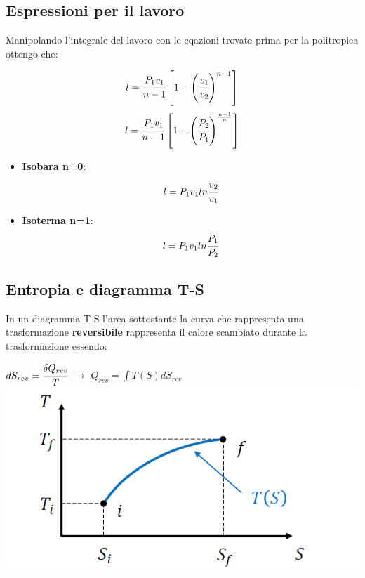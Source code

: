 \documentclass[a4paper,12pt,titlepage]{article}
\begin{document}
\subsection{Espressioni per il lavoro}
Manipolando l'integrale del lavoro con le eqazioni trovate prima per la politropica ottengo che:
\begin{center}
$$ l = \cfrac{P_{1}v_{1}}{n-1}\left[ 1- \left( \cfrac{v_{1}}{v_{2}} \right)^{n-1} \right]
$$
$$
l = \cfrac{P_{1}v_{1}}{n-1}\left[ 1- \left( \cfrac{P_{2}}{P_{1}} \right)^{\frac{n-1}{n}} \right]
$$
\end{center}
\begin{itemize}
\item \textbf{Isobara n=0}: $$ l=P_{1}v_{1}ln\cfrac{v_{2}}{v_{1}} $$ 
\item \textbf{Isoterma n=1}: $$ l=P_{1}v_{1}ln\cfrac{P_{1}}{P_{2}} $$
\end{itemize}
\subsection{Entropia e diagramma T-S}
In un diagramma T-S l'area sottostante la curva che rappresenta una trasformazione \textbf{reversibile} rappresenta il calore scambiato durante la trasformazione essendo:
\begin{center}
$dS_{rev} = \cfrac{\delta Q_{rev}}{T}$ $\rightarrow$ $Q_{rev} = \int T(S)dS_{rev} $\\
\includegraphics[scale=0.5]{t-s_diagram}
\end{center}
\end{document}
